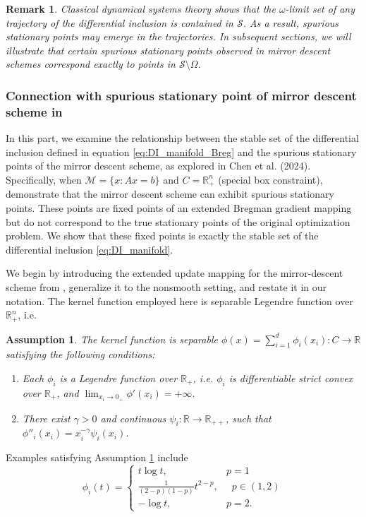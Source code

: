\documentclass[11pt]{article}
\newcommand{\R}{\mathbb R}
\newcommand{\cM}{\mathcal M}
\newtheorem{remark}{Remark}[section]
\newtheorem{assumption}{Assumption}[section]
\begin{document}
\begin{remark}
Classical dynamical systems theory shows that the $ \omega $-limit set of any trajectory of the differential inclusion is contained in $ \mathcal{S} $. As a result, spurious stationary points may emerge in the trajectories. In subsequent sections, we will illustrate that certain spurious stationary points observed in mirror descent schemes correspond exactly to points in $ \mathcal{S} \setminus \Omega $.
\end{remark}

\subsubsection{Connection with spurious stationary point of mirror descent scheme in \cite{chen2024spurious}}
In this part, we examine the relationship between the stable set of the differential inclusion defined in equation \eqref{eq:DI_manifold_Breg} and the spurious stationary points of the mirror descent scheme, as explored in Chen et al. (2024). Specifically, when $\cM=\{x:Ax=b\}$ and $C=\R^n_+$ (special box constraint), \cite{chen2024spurious} demonstrate that the mirror descent scheme can exhibit spurious stationary points. These points are fixed points of an extended Bregman gradient mapping but do not correspond to the true stationary points of the original optimization problem. We show that these fixed points is exactly the stable set of the differential inclusion \eqref{eq:DI_manifold}.

We begin by introducing the extended update mapping for the mirror-descent scheme from \cite{chen2024spurious}, generalize it to the nonsmooth setting, and restate it in our notation. The kernel function employed here is separable Legendre function over $\R^n_{+}$, i.e. 
\begin{assumption}
\label{assumption:separable_phi}
The kernel function is separable $\phi(x)=\sum_{i=1}^d\phi_i(x_i):C\rightarrow\R$ satisfying the following conditions:
\begin{enumerate}
    \item Each $\phi_i$ is a Legendre function over $\R_+$, i.e. $\phi_i$ is differentiable strict convex over $\R_+$, and $\lim_{x_i\rightarrow0_+}\phi'(x_i)=+\infty$.
    \item There exist $\gamma>0$ and continuous $\psi_i:\R\rightarrow\R_{++}$, such that $\phi''_i(x_i)=x_i^{-\gamma}\psi_i(x_i)$.
\end{enumerate}
\end{assumption}
Examples satisfying Assumption \ref{assumption:separable_phi} include 
\[
\phi_i(t)=\left\{
\begin{array}{cc}
    t\log t, & p=1 \\
    \frac{1}{(2-p)(1-p)}t^{2-p}, &\;\; p\in(1,2) \\
    -\log t, & p=2.
\end{array}\right.
\]
\end{document}
